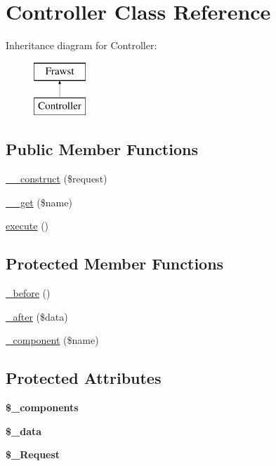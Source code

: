 \hypertarget{classController}{
\section{Controller Class Reference}
\label{classController}
}
Inheritance diagram for Controller:\begin{figure}[H]
\begin{center}
\leavevmode
\includegraphics[height=2.000000cm]{classController}
\end{center}
\end{figure}
\subsection*{Public Member Functions}
\begin{DoxyCompactItemize}
\item 
\hyperlink{classController_ab91faf91a99b21a429324499f9ec9f70}{\_\-\_\-construct} (\$request)
\item 
\hyperlink{classController_ae031bdcdd680eafcc1f36f497db0cdcf}{\_\-\_\-get} (\$name)
\item 
\hyperlink{classController_a9f80ff7e29e17e2de1da86a2ccf4141e}{execute} ()
\end{DoxyCompactItemize}
\subsection*{Protected Member Functions}
\begin{DoxyCompactItemize}
\item 
\hyperlink{classController_ad39427afb53b12d4fc3b037cdd7d01b6}{\_\-before} ()
\item 
\hyperlink{classController_a7f25281d53ef0fed70ae0d687d2cea99}{\_\-after} (\$data)
\item 
\hyperlink{classController_ac425af9dbdb9979417c81a7c07ca6c28}{\_\-component} (\$name)
\end{DoxyCompactItemize}
\subsection*{Protected Attributes}
\begin{DoxyCompactItemize}
\item 
\hypertarget{classController_a9d857b6c224db9e835893cbb77b72028}{
{\bfseries \$\_\-components}}
\label{classController_a9d857b6c224db9e835893cbb77b72028}

\item 
\hypertarget{classController_a00a97dc8ec158668a2689614ee3ecd2b}{
{\bfseries \$\_\-data}}
\label{classController_a00a97dc8ec158668a2689614ee3ecd2b}

\item 
\hypertarget{classController_ad913df9bc5d91dcd80c26bc5e316e726}{
{\bfseries \$\_\-Request}}
\label{classController_ad913df9bc5d91dcd80c26bc5e316e726}

\end{DoxyCompactItemize}


